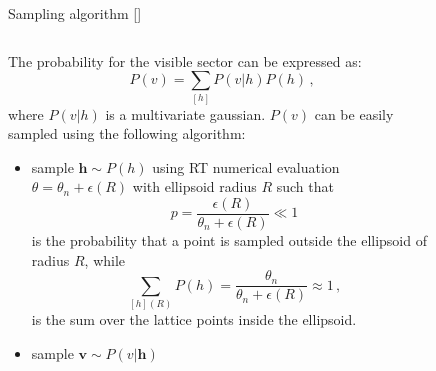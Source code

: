 \documentclass[10pt]{beamer}
\begin{document}
\begin{frame}{Sampling algorithm \hfill \small [\cite{Carrazza:2018nmd}]} 
    \begin{columns}
        \begin{column}[]{0.6 \textwidth}
            The probability for the visible sector can be expressed as:
            \begin{equation*}
                P(v) = \sum_{[h]} P(v|h)P(h)\,,
            \end{equation*}
            where $P(v|h)$ is a multivariate gaussian. $P(v)$ can be easily sampled using the
            following algorithm:
            \begin{itemize}
                \item sample $\textbf{h} \sim P(h)$ using RT numerical evaluation $\theta = \theta_n + \epsilon(R)$
                with ellipsoid radius $R$ such that
            \begin{equation*}
                p = \frac{\epsilon(R)}{\theta_n + \epsilon(R)} \ll 1 
            \end{equation*} 
            is the probability that a point is sampled outside the ellipsoid of radius $R$,
            while
            \begin{equation*}
                \sum_{[h](R)} P(h) = \frac{\theta_n}{\theta_n+\epsilon(R)}\approx 1\,,
            \end{equation*}
            is the sum over the lattice points inside the ellipsoid.
            \item sample $\textbf{v} \sim P(v|\textbf{h})$
            \end{itemize}
        \end{column}
        \begin{column}[]{0.4 \textwidth}
            \begin{figure}[t!]
                \begin{center}

\end{center}
\end{figure}
\end{column}
\end{columns}
\end{frame}
\end{document}
